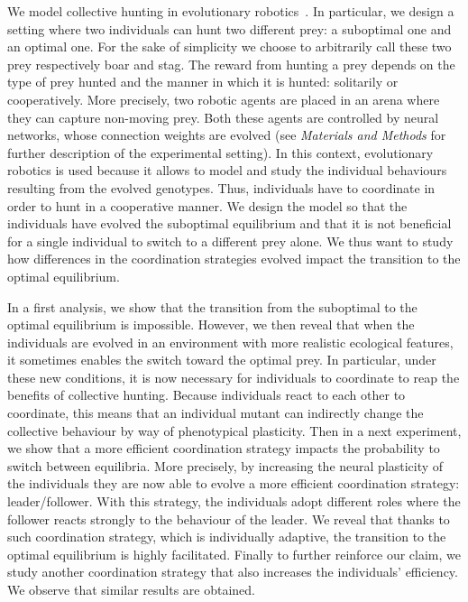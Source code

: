   We model collective hunting in evolutionary robotics~\parencite{Nolfi2000, Doncieux2015}. In particular, we design a setting where two individuals can hunt two different prey: a suboptimal one and an optimal one. For the sake of simplicity we choose to arbitrarily call these two prey respectively boar and stag. The reward from hunting a prey depends on the type of prey hunted and the manner in which it is hunted: solitarily or cooperatively. More precisely, two robotic agents are placed in an arena where they can capture non-moving prey. Both these agents are controlled by neural networks, whose connection weights are evolved (see \emph{Materials and Methods} for further description of the experimental setting). In this context, evolutionary robotics is used because it allows to model and study the individual behaviours resulting from the evolved genotypes. Thus, individuals have to coordinate in order to hunt in a cooperative manner. We design the model so that the individuals have evolved the suboptimal equilibrium and that it is not beneficial for a single individual to switch to a different prey alone. We thus want to study how differences in the coordination strategies evolved impact the transition to the optimal equilibrium.

  In a first analysis, we show that the transition from the suboptimal to the optimal equilibrium is impossible. However, we then reveal that when the individuals are evolved in an environment with more realistic ecological features, it sometimes enables the switch toward the optimal prey. In particular, under these new conditions, it is now necessary for individuals to coordinate to reap the benefits of collective hunting. Because individuals react to each other to coordinate, this means that an individual mutant can indirectly change the collective behaviour by way of phenotypical plasticity. Then in a next experiment, we show that a more efficient coordination strategy impacts the probability to switch between equilibria. More precisely, by increasing the neural plasticity of the individuals they are now able to evolve a more efficient coordination strategy: leader/follower. With this strategy, the individuals adopt different roles where the follower reacts strongly to the behaviour of the leader. We reveal that thanks to such coordination strategy, which is individually adaptive, the transition to the optimal equilibrium is highly facilitated. Finally to further reinforce our claim, we study another coordination strategy that also increases the individuals' efficiency. We observe that similar results are obtained.



